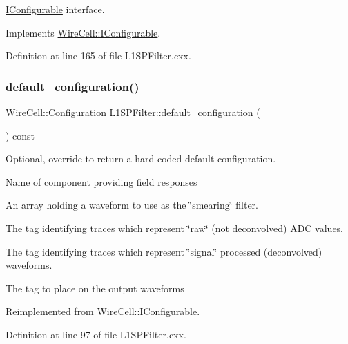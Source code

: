\hyperlink{class_wire_cell_1_1_i_configurable}{I\+Configurable} interface. 



Implements \hyperlink{class_wire_cell_1_1_i_configurable_a57ff687923a724093df3de59c6ff237d}{Wire\+Cell\+::\+I\+Configurable}.



Definition at line 165 of file L1\+S\+P\+Filter.\+cxx.

\mbox{\label{class_wire_cell_1_1_sig_proc_1_1_l1_s_p_filter_aa37fc09d196529f29eb2477fe1c0317a}} 
\subsubsection{\texorpdfstring{default\+\_\+configuration()}{default\_configuration()}}
{\footnotesize\ttfamily \hyperlink{namespace_wire_cell_a9f705541fc1d46c608b3d32c182333ee}{Wire\+Cell\+::\+Configuration} L1\+S\+P\+Filter\+::default\+\_\+configuration (\begin{DoxyParamCaption}{ }\end{DoxyParamCaption}) const\hspace{0.3cm}{\ttfamily [virtual]}}



Optional, override to return a hard-\/coded default configuration. 

Name of component providing field responses

An array holding a waveform to use as the \char`\"{}smearing\char`\"{} filter.

The tag identifying traces which represent \char`\"{}raw\char`\"{} (not deconvolved) A\+DC values.

The tag identifying traces which represent \char`\"{}signal\char`\"{} processed (deconvolved) waveforms.

The tag to place on the output waveforms 

Reimplemented from \hyperlink{class_wire_cell_1_1_i_configurable_a54841b2da3d1ea02189478bff96f7998}{Wire\+Cell\+::\+I\+Configurable}.



Definition at line 97 of file L1\+S\+P\+Filter.\+cxx.

